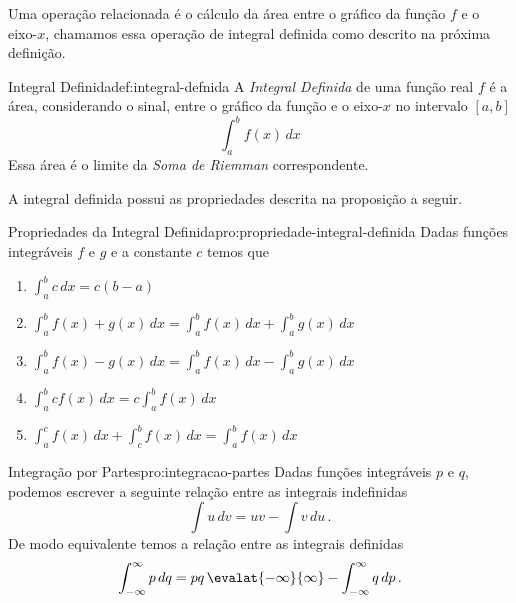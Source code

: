 Uma operação relacionada é o cálculo da área entre o gráfico da função $f$ e
o eixo-$x$, chamamos essa operação de integral definida como descrito na
próxima definição.

\begin{definicao}{Integral Definida}{def:integral-defnida}
  A \emph{Integral Definida} de uma função real $f$
  é a área, considerando o sinal, entre o gráfico da função e o eixo-$x$
  no intervalo $[a, b]$
  \[
    \int_{a}^{b} f(x) \, dx
  \]
  Essa área é o limite da \emph{Soma de Riemman} correspondente.
\end{definicao}

A integral definida possui as propriedades descrita na proposição a seguir.

\begin{proposicao}{Propriedades da Integral Definida}{pro:propriedade-integral-definida}
  Dadas funções integráveis $f$ e $g$ e a constante $c$ temos que
  \begin{enumerate}
    \item \( \int_a^b c\,dx = c(b-a) \)
    \item \( \int_a^b f(x)+g(x)\,dx = \int_a^b f(x)\,dx + \int_a^b g(x)\,dx\)
    \item \( \int_a^b f(x)-g(x)\,dx = \int_a^b f(x)\,dx - \int_a^b g(x)\,dx\)
    \item \( \int_a^b cf(x)\,dx = c \int_a^b f(x)\,dx \)
    \item \( \int_a^c f(x)\,dx + \int_c^b f(x)\,dx = \int_a^b f(x)\,dx \)
  \end{enumerate}
\end{proposicao}

\begin{proposicao}{Integração por Partes}{pro:integracao-partes}
  Dadas funções integráveis $p$ e $q$, podemos escrever a seguinte relação
  entre as integrais indefinidas
  \[
    \int u\,dv = uv - \int v\,du \,.
  \]
  De modo equivalente temos a relação entre as integrais definidas
  \[
    \int_{-\infty}^\infty p\,dq = pq \, \evalat{-\infty}{\infty} - \int_{-\infty}^\infty q\,dp \,.
  \]
\end{proposicao}

